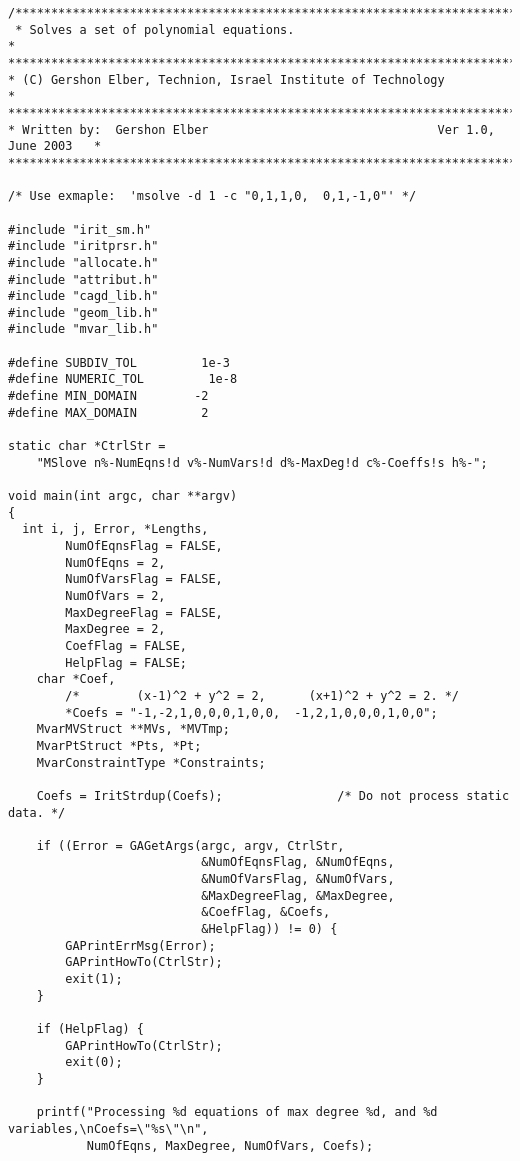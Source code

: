 \begin{verbatim}
/*****************************************************************************
 * Solves a set of polynomial equations.                                     *
******************************************************************************
* (C) Gershon Elber, Technion, Israel Institute of Technology                *
******************************************************************************
* Written by:  Gershon Elber                                Ver 1.0, June 2003   *
*****************************************************************************/

/* Use exmaple:  'msolve -d 1 -c "0,1,1,0,  0,1,-1,0"' */

#include "irit_sm.h"
#include "iritprsr.h"
#include "allocate.h"
#include "attribut.h"
#include "cagd_lib.h"
#include "geom_lib.h"
#include "mvar_lib.h"

#define SUBDIV_TOL         1e-3
#define NUMERIC_TOL         1e-8
#define MIN_DOMAIN        -2
#define MAX_DOMAIN         2

static char *CtrlStr =
    "MSlove n%-NumEqns!d v%-NumVars!d d%-MaxDeg!d c%-Coeffs!s h%-";

void main(int argc, char **argv)
{
  int i, j, Error, *Lengths,
        NumOfEqnsFlag = FALSE,
        NumOfEqns = 2,
        NumOfVarsFlag = FALSE,
        NumOfVars = 2,
        MaxDegreeFlag = FALSE,
        MaxDegree = 2,
        CoefFlag = FALSE,
        HelpFlag = FALSE;
    char *Coef,
        /*        (x-1)^2 + y^2 = 2,      (x+1)^2 + y^2 = 2. */
        *Coefs = "-1,-2,1,0,0,0,1,0,0,  -1,2,1,0,0,0,1,0,0";
    MvarMVStruct **MVs, *MVTmp;
    MvarPtStruct *Pts, *Pt;
    MvarConstraintType *Constraints;

    Coefs = IritStrdup(Coefs);                /* Do not process static data. */

    if ((Error = GAGetArgs(argc, argv, CtrlStr,
                           &NumOfEqnsFlag, &NumOfEqns,
                           &NumOfVarsFlag, &NumOfVars,
                           &MaxDegreeFlag, &MaxDegree,
                           &CoefFlag, &Coefs,
                           &HelpFlag)) != 0) {
        GAPrintErrMsg(Error);
        GAPrintHowTo(CtrlStr);
        exit(1);
    }

    if (HelpFlag) {
        GAPrintHowTo(CtrlStr);
        exit(0);
    }

    printf("Processing %d equations of max degree %d, and %d variables,\nCoefs=\"%s\"\n",
           NumOfEqns, MaxDegree, NumOfVars, Coefs);


\end{verbatim}
